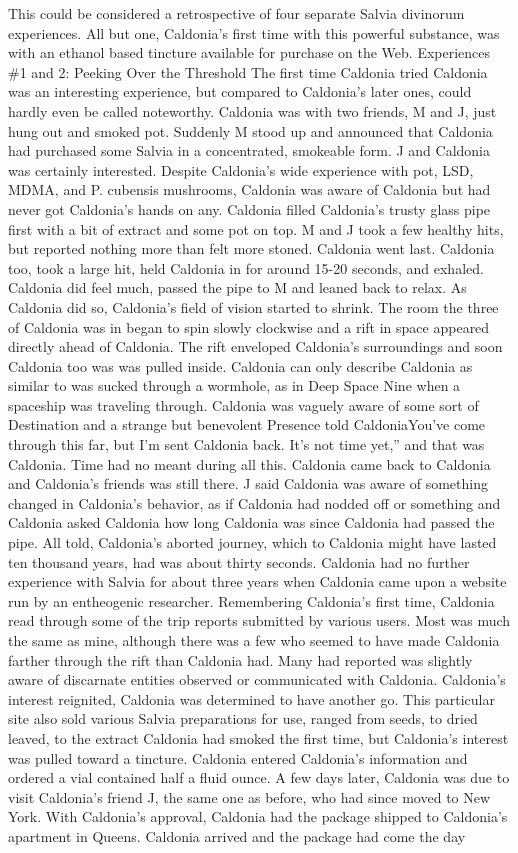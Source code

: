 \documentclass[12pt]{book}
\begin{document}
This could be considered a retrospective of four separate Salvia divinorum experiences. All but one, Caldonia's first time with this powerful substance, was with an ethanol based tincture available for purchase on the Web. Experiences \#1 and 2: Peeking Over the Threshold The first time Caldonia tried Caldonia was an interesting experience, but compared to Caldonia's later ones, could hardly even be called noteworthy. Caldonia was with two friends, M and J, just hung out and smoked pot. Suddenly M stood up and announced that Caldonia had purchased some Salvia in a concentrated, smokeable form. J and Caldonia was certainly interested. Despite Caldonia's wide experience with pot, LSD, MDMA, and P. cubensis mushrooms, Caldonia was aware of Caldonia but had never got Caldonia's hands on any. Caldonia filled Caldonia's trusty glass pipe first with a bit of extract and some pot on top. M and J took a few healthy hits, but reported nothing more than felt more stoned. Caldonia went last. Caldonia too, took a large hit, held Caldonia in for around 15-20 seconds, and exhaled. Caldonia did feel much, passed the pipe to M and leaned back to relax. As Caldonia did so, Caldonia's field of vision started to shrink. The room the three of Caldonia was in began to spin slowly clockwise and a rift in space appeared directly ahead of Caldonia. The rift enveloped Caldonia's surroundings and soon Caldonia too was was pulled inside. Caldonia can only describe Caldonia as similar to was sucked through a wormhole, as in Deep Space Nine when a spaceship was traveling through. Caldonia was vaguely aware of some sort of Destination and a strange but benevolent Presence told CaldoniaYou've come through this far, but I'm sent Caldonia back. It's not time yet,'' and that was Caldonia. Time had no meant during all this. Caldonia came back to Caldonia and Caldonia's friends was still there. J said Caldonia was aware of something changed in Caldonia's behavior, as if Caldonia had nodded off or something and Caldonia asked Caldonia how long Caldonia was since Caldonia had passed the pipe. All told, Caldonia's aborted journey, which to Caldonia might have lasted ten thousand years, had was about thirty seconds. Caldonia had no further experience with Salvia for about three years when Caldonia came upon a website run by an entheogenic researcher. Remembering Caldonia's first time, Caldonia read through some of the trip reports submitted by various users. Most was much the same as mine, although there was a few who seemed to have made Caldonia farther through the rift than Caldonia had. Many had reported was slightly aware of discarnate entities observed or communicated with Caldonia. Caldonia's interest reignited, Caldonia was determined to have another go. This particular site also sold various Salvia preparations for use, ranged from seeds, to dried leaved, to the extract Caldonia had smoked the first time, but Caldonia's interest was pulled toward a tincture. Caldonia entered Caldonia's information and ordered a vial contained half a fluid ounce. A few days later, Caldonia was due to visit Caldonia's friend J, the same one as before, who had since moved to New York. With Caldonia's approval, Caldonia had the package shipped to Caldonia's apartment in Queens. Caldonia arrived and the package had come the day 
\end{document}

